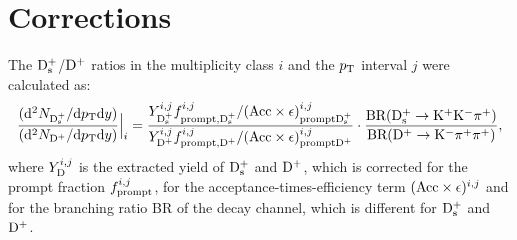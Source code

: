 \section{Corrections}
\label{sec:Corrections}
The ${\rm D_s^+}$/${\rm D^+}$ ratios in the multiplicity class $i$ and the $p_{\rm T}$ interval $j$ were calculated
as:
\begin{equation} 
\label{eq:NtrklCorr}
 \frac{({\rm d}^2N_{{\rm D_s^+}}/{\rm d}p_{\rm T} {\rm d}y)}{({\rm d}^2N_{{\rm D^+}}/{\rm d}p_{\rm T} {\rm d}y)} \Big |_i = \frac{Y^{i, j}_{{\rm D_s^+}}  f^{i, j}_{\rm prompt, {\rm D_s^+}} / ({\rm Acc} \times \epsilon)^{i, j}_{\rm prompt {\rm D_s^+}}}{Y^{i, j}_{{\rm D^+}}  f^{i, j}_{\rm prompt, {\rm D^+}} / ({\rm Acc} \times \epsilon)^{i, j}_{\rm prompt {\rm D^+}}} \cdot \frac{\rm BR({\rm D^{+}_\mathrm{s}\to K^+ K^-\pi^+})}{\rm BR({\rm D}^+\to {\rm K}^-\pi^+\pi^+)},
\end{equation}
where $Y^{i, j}_{\rm D}$ is the extracted yield of ${\rm D_s^+}$ and ${\rm D^+}$, which is corrected for the prompt fraction
$f^{i, j}_{\rm prompt}$, for the acceptance-times-efficiency term $({\rm Acc} \times \epsilon)^{i, j}$ and for
the branching ratio BR of the decay channel, which is different for ${\rm D_s^+}$ and ${\rm D^+}$.\\




